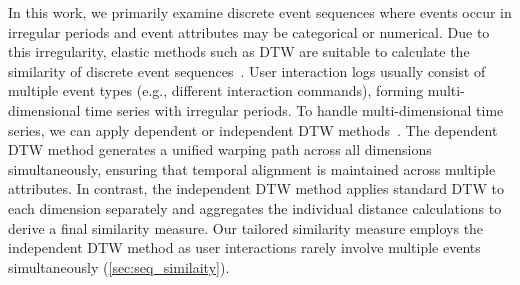 \documentclass[preprint,journal]{vgtc}            %
\begin{document}
In this work, we primarily examine discrete event sequences where events occur in irregular periods and event attributes may be categorical or numerical. 
Due to this irregularity, elastic methods such as DTW are suitable to calculate the similarity of discrete event sequences~\cite{Keogh05Clustering, Saeed15Time}.
User interaction logs usually consist of multiple event types (e.g., different interaction commands), forming multi-dimensional time series with irregular periods.
To handle multi-dimensional time series, we can apply dependent or independent DTW methods~\cite{Shokoohi17Generalizing}.
The dependent DTW method generates a unified warping path across all dimensions simultaneously, ensuring that temporal alignment is maintained across multiple attributes. 
In contrast, the independent DTW method applies standard DTW to each dimension separately and aggregates the individual distance calculations to derive a final similarity measure.
Our tailored similarity measure employs the independent DTW method as user interactions rarely involve multiple events simultaneously (\cref{sec:seq_similaity}).


\end{document}
